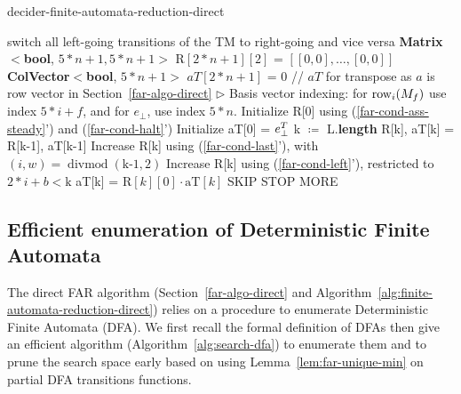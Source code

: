\begin{algorithm}
  \caption{{\sc decider-finite-automata-reduction-direct}}\label{alg:finite-automata-reduction-direct}

  \begin{algorithmic}[1]
     switch all left-going transitions of the TM to right-going and vice versa
    \EndIf
    \State \textbf{Matrix$\boldsymbol<$bool}, $5*n+1, 5*n+1${}$\boldsymbol>$ $\textrm{R}[2*n+1][2]$ = $[[0,0],\ldots,[0,0]]$
    \State \textbf{ColVector$\boldsymbol<$bool}, $5*n+1${}$\boldsymbol>$ $aT[2*n+1]$ = 0 // $aT$ for transpose as $a$ is row vector in Section~\ref{far-algo-direct}
    \State \(\triangleright\) Basis vector indexing: for $\text{row}_i(M_f)$ use index $5*i+f$, and for $e_\bot$, use index $5*n$.
    \State Initialize R[0] using (\ref{far-cond-ass-steady}') and (\ref{far-cond-halt}')
    \State Initialize aT[0] = $e_\bot^T$
    \State k $\coloneqq$ L.\textbf{length}
    \State R[k], aT[k] = R[k-1], aT[k-1]
    \State Increase R[k] using (\ref{far-cond-last}'), with $(i,w)=\operatorname{divmod}(\textrm{k-1}, 2)$
    \Repeat
    \State Increase R[k] using (\ref{far-cond-left}'), restricted to $2*i+b<\textrm{k}$
    \Repeat
    \State aT[k] = $\textrm{R}[k][0] \cdot \textrm{aT}[k]$
    \Return SKIP
    \Return STOP
    \Else\;\Return MORE
    \EndIf
    \EndProcedure
    \State \Return {}
    \EndProcedure
  \end{algorithmic}
\end{algorithm}

\subsection{Efficient enumeration of Deterministic Finite Automata}
\label{far-defs-dfa}
The direct FAR algorithm (Section~\ref{far-algo-direct} and Algorithm~\ref{alg:finite-automata-reduction-direct}) relies on a procedure to enumerate Deterministic Finite Automata (DFA). We first recall the formal definition of DFAs then give an efficient algorithm (Algorithm~\ref{alg:search-dfa}) to enumerate them and to prune the search space early based on using Lemma~\ref{lem:far-unique-min} on partial DFA transitions functions.

